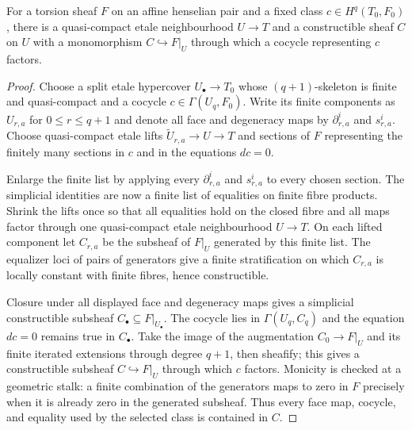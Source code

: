 \begin{lemma}
\label{lemma:weil-pbc-constructible-approximation}
\uses{}
For a torsion sheaf $F$ on an affine henselian pair and a fixed class
$c\in H^q(T_0,F_0)$, there is a quasi-compact etale neighbourhood $U\to T$
and a constructible sheaf $C$ on $U$ with a monomorphism $C\hookrightarrow F|_U$
through which a cocycle representing $c$ factors.
\end{lemma}
\begin{proof}
\uses{} 
Choose a split etale hypercover $U_\bullet\to T_0$ whose $(q+1)$-skeleton is
finite and quasi-compact and a cocycle $c\in\Gamma(U_q,F_0)$.  Write its
finite components as $U_{r,a}$ for $0\leq r\leq q+1$ and denote all face and
degeneracy maps by $\partial^i_{r,a}$ and $s^i_{r,a}$.  Choose quasi-compact
etale lifts $\widetilde U_{r,a}\to U\to T$ and sections of $F$ representing
the finitely many sections in $c$ and in the equations $dc=0$.

Enlarge the finite list by applying every $\partial^i_{r,a}$ and
$s^i_{r,a}$ to every chosen section.  The simplicial identities are now a
finite list of equalities on finite fibre products.  Shrink the lifts once so
that all equalities hold on the closed fibre and all maps factor through one
quasi-compact etale neighbourhood $U\to T$.  On each lifted component let
$C_{r,a}$ be the subsheaf of $F|_U$ generated by this finite list.  The
equalizer loci of pairs of generators give a finite stratification on which
$C_{r,a}$ is locally constant with finite fibres, hence constructible.

Closure under all displayed face and degeneracy maps gives a simplicial
constructible subsheaf $C_\bullet\subseteq F|_{U_\bullet}$.  The cocycle lies
in $\Gamma(U_q,C_q)$ and the equation $dc=0$ remains true in $C_\bullet$.
Take the image of the augmentation $C_0\to F|_U$ and its finite iterated
extensions through degree $q+1$, then sheafify; this gives a constructible
subsheaf $C\hookrightarrow F|_U$ through which $c$ factors.  Monicity is
checked at a geometric stalk: a finite combination of the generators maps to
zero in $F$ precisely when it is already zero in the generated subsheaf.
Thus every face map, cocycle, and equality used by the selected class is
contained in $C$.
\end{proof}

